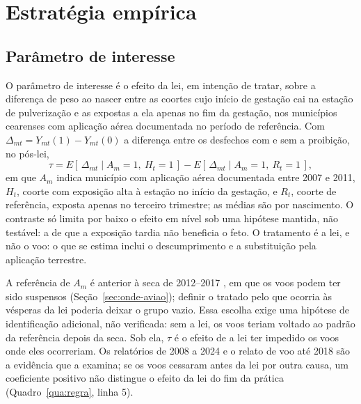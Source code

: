 
\chapter{Estratégia empírica}
\label{cap:metodologia}

\section{Parâmetro de interesse}

O parâmetro de interesse é o efeito da lei, em intenção de tratar, sobre a
diferença de peso ao nascer entre as coortes cujo início de gestação cai na
estação de pulverização e as expostas a ela apenas no fim da gestação, nos
municípios cearenses com aplicação aérea documentada no período de referência.
Com $\Delta_{mt} = Y_{mt}(1) - Y_{mt}(0)$ a diferença entre os desfechos com e
sem a proibição, no pós-lei,
\begin{equation}
  \tau = E\left[\,\Delta_{mt} \mid A_m = 1,\ H_t = 1\,\right]
       - E\left[\,\Delta_{mt} \mid A_m = 1,\ R_t = 1\,\right],
\end{equation}
em que $A_m$ indica município com aplicação aérea documentada entre 2007 e
2011, $H_t$, coorte com exposição alta à estação no início da gestação, e
$R_t$, coorte de referência, exposta apenas no terceiro trimestre; as médias
são por nascimento. O contraste só limita por baixo o efeito em nível sob uma
hipótese mantida, não testável: a de que a exposição tardia não beneficia o
feto. O tratamento é a lei, e não o voo: o que se estima inclui o
descumprimento e a substituição pela aplicação terrestre.

A referência de $A_m$ é anterior à seca de 2012--2017 \cite{rebello2018seca},
em que os voos podem ter sido suspensos (Seção~\ref{sec:onde-aviao}); definir o
tratado pelo que ocorria às vésperas da lei poderia deixar o grupo vazio. Essa
escolha exige uma hipótese de identificação adicional, não verificada: sem a
lei, os voos teriam voltado ao padrão da referência depois da seca. Sob ela,
$\tau$ é o efeito de a lei ter impedido os voos onde eles ocorreriam. Os
relatórios de 2008 a 2024 e o relato de voo até 2018 são a evidência que a
examina; se os voos cessaram antes da lei por outra causa, um coeficiente
positivo não distingue o efeito da lei do fim da prática
(Quadro~\ref{qua:regra}, linha 5).

